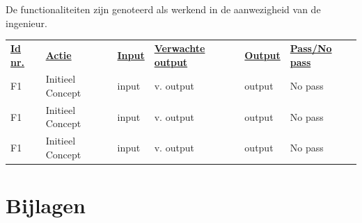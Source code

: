 \documentclass{article}
\begin{document}
De functionaliteiten zijn genoteerd als werkend in de aanwezigheid van de ingenieur.

\begin{table}[htp]
\begin{tabular}{llllll}
\rowcolor[HTML]{FFD700} 
{\ul \textbf{Id nr.}} & {\ul \textbf{Actie}} & {\ul \textbf{Input}} & {\ul \textbf{Verwachte output}} & {\ul \textbf{Output}} & {\ul \textbf{Pass/No pass}} \\
F1 & Initieel Concept & input & v. output & output & No pass \\     
F1 & Initieel Concept & input & v. output & output & No pass \\ 
F1 & Initieel Concept & input & v. output & output & No pass
\end{tabular}
\end{table}

\section{Bijlagen}
\newpage


\end{document}
